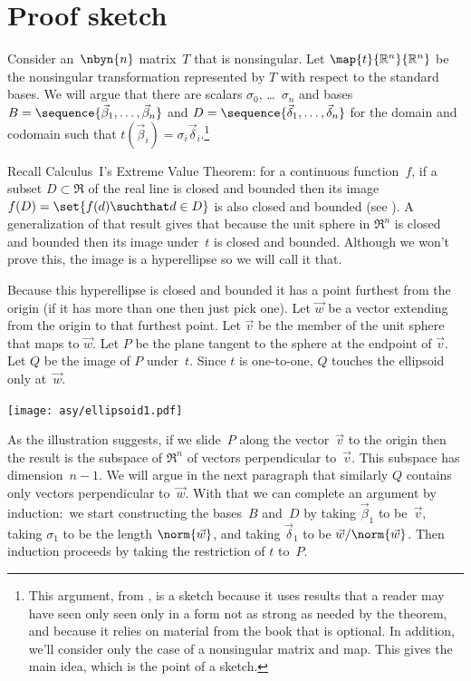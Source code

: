 \section{Proof sketch}

Consider an~$\nbyn{n}$ matrix~$T$ that is nonsingular.
Let $\map{t}{\Re^n}{\Re^n}$ be the
nonsingular transformation represented by
$T$ with respect to the standard bases.
We will argue that there are scalars $\sigma_0$, \ldots~$\sigma_n$
and bases
$B=\sequence{\vec{\beta}_1,\ldots,\vec{\beta}_n}$ and
$D=\sequence{\vec{\delta}_1,\ldots,\vec{\delta}_n}$ for the 
domain and codomain
such that $t(\vec{\beta}_i)=\sigma_i\vec{\delta}_i.$\footnote{%
  This argument, 
  from \protect\cite{BlankKrikorianSpring89},
  is a sketch because it uses results that a reader may have seen only 
  seen only in a form not as strong as needed by the theorem, 
  and because it relies on material from the book that is optional.
  In addition, we'll consider only the case of a nonsingular matrix and map.
  This gives the main idea, which is the point of a sketch.}

Recall Calculus~I's Extreme Value Theorem: for a continuous
function~$f$, if a subset $D\subset \Re$ of the real line 
is closed and bounded then
its image $f(D)=\set{f(d)\suchthat d\in D}$ 
is also closed and bounded (see \cite{wiki:ExtremeValueThm}).
A generalization of that result gives that because the unit sphere in $\Re^n$
is closed and bounded then its image under~$t$ is closed and bounded.
Although we won't prove this, the image is a hyperellipse
so we will call it that. 

Because this hyperellipse is closed and bounded it has a 
point furthest from the origin (if it has more than one then just pick one).
Let $\vec{w}$ be a vector extending from the origin to that furthest point.
Let $\vec{v}$ be the member of the unit sphere that maps to $\vec{w}$.
Let $P$ be the plane tangent to the sphere at the endpoint of $\vec{v}$.
Let $Q$ be the image of $P$ under~$t$.
Since $t$ is one-to-one, $Q$ touches the ellipsoid only at~$\vec{w}$.
\begin{center}
  \texttt{[image: asy/ellipsoid1.pdf]}
\end{center}

As the illustration suggests, if we slide~$P$ along the 
vector~$\vec{v}$ to
the origin then the result is 
the subspace of $\Re^n$ of vectors perpendicular
to~$\vec{v}$.
This subspace has dimension~$n-1$. 
We will argue in the next paragraph 
that similarly $Q$ contains only
vectors perpendicular to~$\vec{w}$.
With that we can complete an argument by induction:~we 
start constructing the 
bases~$B$ and~$D$ by taking $\vec{\beta}_1$ to be~$\vec{v}$, taking
$\sigma_1$ to be the length $\norm{\vec{w}}$, and taking
$\vec{\delta}_1$ to be $\vec{w}/\norm{\vec{w}}$.
Then induction proceeds by taking the restriction of $t$ to~$P$.

